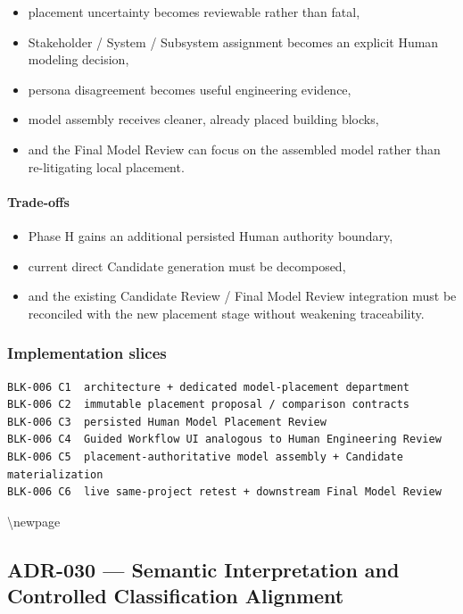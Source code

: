 \begin{itemize}
\tightlist
\item
  placement uncertainty becomes reviewable rather than fatal,
\item
  Stakeholder / System / Subsystem assignment becomes an explicit Human modeling decision,
\item
  persona disagreement becomes useful engineering evidence,
\item
  model assembly receives cleaner, already placed building blocks,
\item
  and the Final Model Review can focus on the assembled model rather than re-litigating local placement.
\end{itemize}

\hypertarget{trade-offs-7}{%
\paragraph{Trade-offs}\label{trade-offs-7}}

\begin{itemize}
\tightlist
\item
  Phase H gains an additional persisted Human authority boundary,
\item
  current direct Candidate generation must be decomposed,
\item
  and the existing Candidate Review / Final Model Review integration must be reconciled with the new placement stage without weakening traceability.
\end{itemize}

\hypertarget{implementation-slices-2}{%
\subsubsection{Implementation slices}\label{implementation-slices-2}}

\begin{verbatim}
BLK-006 C1  architecture + dedicated model-placement department
BLK-006 C2  immutable placement proposal / comparison contracts
BLK-006 C3  persisted Human Model Placement Review
BLK-006 C4  Guided Workflow UI analogous to Human Engineering Review
BLK-006 C5  placement-authoritative model assembly + Candidate materialization
BLK-006 C6  live same-project retest + downstream Final Model Review
\end{verbatim}

\textbackslash newpage

\hypertarget{adr-030--semantic-interpretation-and-controlled-classification-alignment}{%
\subsection{ADR-030 --- Semantic Interpretation and Controlled Classification Alignment}\label{adr-030--semantic-interpretation-and-controlled-classification-alignment}}

